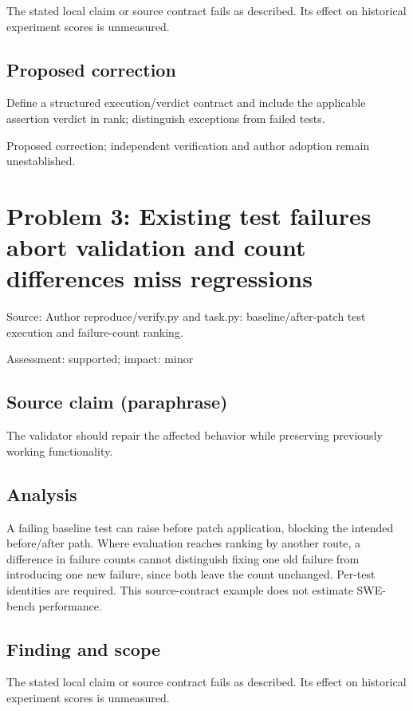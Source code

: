 \documentclass[11pt]{article}
\begin{document}
The stated local claim or source contract fails as described. Its effect on historical experiment scores is unmeasured.

\subsection*{Proposed correction}

Define a structured execution/verdict contract and include the applicable assertion verdict in rank; distinguish exceptions from failed tests.

Proposed correction; independent verification and author adoption remain unestablished.

\section*{Problem 3: Existing test failures abort validation and count differences miss regressions}

Source: Author reproduce/verify.py and task.py: baseline/after-patch test execution and failure-count ranking.

Assessment: supported; impact: minor

\subsection*{Source claim (paraphrase)}

The validator should repair the affected behavior while preserving previously working functionality.

\subsection*{Analysis}

A failing baseline test can raise before patch application, blocking the intended before/after path. Where evaluation reaches ranking by another route, a difference in failure counts cannot distinguish fixing one old failure from introducing one new failure, since both leave the count unchanged. Per-test identities are required. This source-contract example does not estimate SWE-bench performance.

\subsection*{Finding and scope}

The stated local claim or source contract fails as described. Its effect on historical experiment scores is unmeasured.
\end{document}
